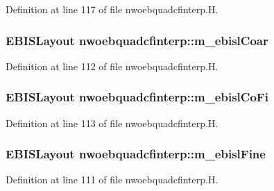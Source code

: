 Definition at line 117 of file nwoebquadcfinterp.\+H.

\subsubsection[{\texorpdfstring{m\+\_\+ebisl\+Coar}{m_ebislCoar}}]{\setlength{\rightskip}{0pt plus 5cm}E\+B\+I\+S\+Layout nwoebquadcfinterp\+::m\+\_\+ebisl\+Coar\hspace{0.3cm}{\ttfamily [protected]}}\hypertarget{classnwoebquadcfinterp_a49d4a5fcaf4fcf12714009d2c7eec3ac}{}\label{classnwoebquadcfinterp_a49d4a5fcaf4fcf12714009d2c7eec3ac}


Definition at line 112 of file nwoebquadcfinterp.\+H.

\subsubsection[{\texorpdfstring{m\+\_\+ebisl\+Co\+Fi}{m_ebislCoFi}}]{\setlength{\rightskip}{0pt plus 5cm}E\+B\+I\+S\+Layout nwoebquadcfinterp\+::m\+\_\+ebisl\+Co\+Fi\hspace{0.3cm}{\ttfamily [protected]}}\hypertarget{classnwoebquadcfinterp_a1af61857678e74133a95ec8fa9dcf49d}{}\label{classnwoebquadcfinterp_a1af61857678e74133a95ec8fa9dcf49d}


Definition at line 113 of file nwoebquadcfinterp.\+H.

\subsubsection[{\texorpdfstring{m\+\_\+ebisl\+Fine}{m_ebislFine}}]{\setlength{\rightskip}{0pt plus 5cm}E\+B\+I\+S\+Layout nwoebquadcfinterp\+::m\+\_\+ebisl\+Fine\hspace{0.3cm}{\ttfamily [protected]}}\hypertarget{classnwoebquadcfinterp_ad8747e5d6dcb3613235df12c5a72f51a}{}\label{classnwoebquadcfinterp_ad8747e5d6dcb3613235df12c5a72f51a}


Definition at line 111 of file nwoebquadcfinterp.\+H.

